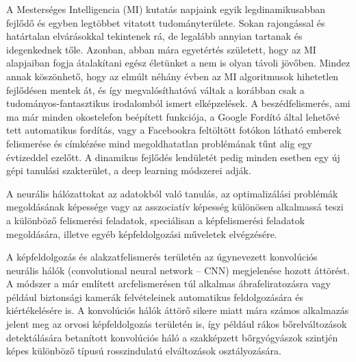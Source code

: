 
A Mesterséges Intelligencia (MI) kutatás napjaink egyik legdinamikusabban fejlődő és egyben legtöbbet vitatott tudományterülete. Sokan rajongással és határtalan elvárásokkal tekintenek rá, de legalább annyian tartanak és idegenkednek tőle. Azonban, abban mára egyetértés született, hogy az MI alapjaiban fogja átalakítani egész életünket a nem is olyan távoli jövőben. Mindez annak köszönhető, hogy az elmúlt néhány évben az MI algoritmusok hihetetlen fejlődésen mentek át, és így megvalósíthatóvá váltak a korábban csak a tudományos-fantasztikus irodalomból ismert elképzelések. A beszédfelismerés, ami ma már minden okostelefon beépített funkciója, a Google Fordító által lehetővé tett automatikus fordítás, vagy a Facebookra feltöltött fotókon látható emberek felismerése és címkézése mind megoldhatatlan problémának tűnt alig egy évtizeddel ezelőtt. A dinamikus fejlődés lendületét pedig minden esetben egy új gépi tanulási szakterület, a deep learning módszerei adják.

A neurális hálózattokat az adatokból való tanulás, az optimalizálási problémák megoldásának képessége vagy az asszociatív képesség különösen alkalmassá teszi a különböző felismerési feladatok, speciálisan a képfelismerési feladatok megoldására, illetve egyéb képfeldolgozási műveletek elvégzésére.

A képfeldolgozás és alakzatfelismerés területén az úgynevezett konvolúciós neurális hálók (convolutional neural network – CNN) megjelenése hozott áttörést. A módszer a már említett arcfelismerésen túl alkalmas ábrafeliratozásra vagy például biztonsági kamerák felvételeinek automatikus feldolgozására és kiértékelésére is. A konvolúciós hálók áttörő sikere miatt mára számos alkalmazás jelent meg az orvosi képfeldolgozás területén is, így például rákos bőrelváltozások detektálására betanított konvolúciós háló a szakképzett bőrgyógyászok szintjén képes különböző típusú rosszindulatú elváltozások osztályozására.

\begin{comment}{Ez így kicsit általános, de elég lesz a végén átfogalmazni.}
\end{comment}
